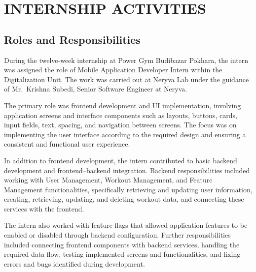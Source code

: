 %
\chapter{INTERNSHIP ACTIVITIES}

\section{Roles and Responsibilities}
During the twelve-week internship at Power Gym Budibazar Pokhara, the intern was assigned the role of Mobile Application Developer Intern within the Digitalization Unit. The work was carried out at Neryva Lab under the guidance of Mr.~Krishna Subedi, Senior Software Engineer at Neryva.

The primary role was frontend development and UI implementation, involving application screens and interface components such as layouts, buttons, cards, input fields, text, spacing, and navigation between screens. The focus was on implementing the user interface according to the required design and ensuring a consistent and functional user experience.

In addition to frontend development, the intern contributed to basic backend development and frontend--backend integration. Backend responsibilities included working with User Management, Workout Management, and Feature Management functionalities, specifically retrieving and updating user information, creating, retrieving, updating, and deleting workout data, and connecting these services with the frontend.

The intern also worked with feature flags that allowed application features to be enabled or disabled through backend configuration. Further responsibilities included connecting frontend components with backend services, handling the required data flow, testing implemented screens and functionalities, and fixing errors and bugs identified during development.

